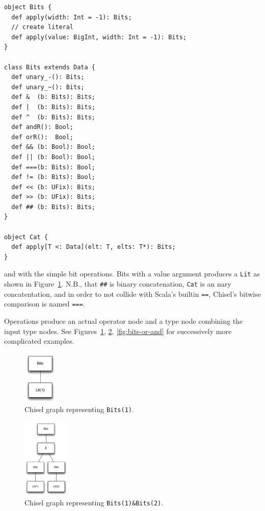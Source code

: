\documentclass[10pt,twocolumn]{article}
\def\code#1{{\small\tt #1}}
\begin{document}
\begin{lstlisting}
object Bits {
  def apply(width: Int = -1): Bits;
  // create literal
  def apply(value: BigInt, width: Int = -1): Bits;
}

class Bits extends Data {
  def unary_-(): Bits;
  def unary_~(): Bits;
  def &  (b: Bits): Bits;
  def |  (b: Bits): Bits;
  def ^  (b: Bits): Bits;
  def andR(): Bool;
  def orR():  Bool;
  def && (b: Bool): Bool;
  def || (b: Bool): Bool;
  def ===(b: Bits): Bool;
  def != (b: Bits): Bool;
  def << (b: UFix): Bits;
  def >> (b: UFix): Bits;
  def ## (b: Bits): Bits;
}

object Cat {
  def apply[T <: Data](elt: T, elts: T*): Bits;
}
\end{lstlisting}

\noindent
and with the simple bit operations.  
Bits with a value argument produces a \code{Lit} as shown in Figure~\ref{fig:bits-1}.
N.B., that \code{\#\#} is binary
concatenation, \code{Cat} is an nary concatentation,
and in order to not collide with Scala's builtin \code{==},
Chisel's bitwise comparison is named \code{===}.

Operations produce an actual operator node and a type node combining the input type nodes.
See Figures~\ref{fig:bits-1}, \ref{fig:bits-and}, \ref{fig:bits-or-and} for
successively more complicated examples.

\begin{figure}[h]
\centering
\includegraphics[height=1in]{figs/bits-1.pdf}
\caption{Chisel graph representing {\tt\footnotesize Bits(1)}.}
\label{fig:bits-1}
\end{figure}

\begin{figure}[h]
\centering
\includegraphics[height=1.5in]{figs/bits-and.pdf}
\caption{Chisel graph representing {\tt\footnotesize Bits(1)\&Bits(2)}.}
\label{fig:bits-and}
\end{figure}
\end{document}
